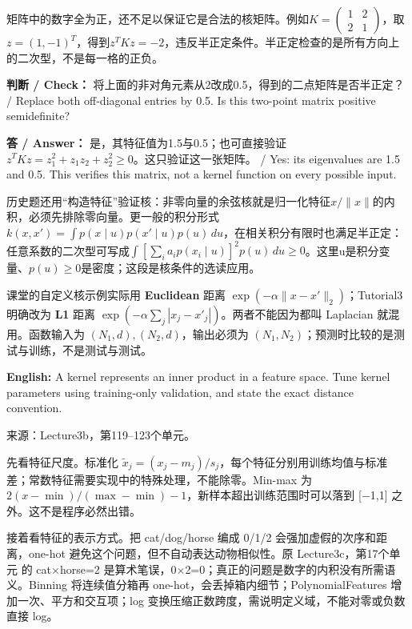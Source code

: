 矩阵中的数字全为正，还不足以保证它是合法的核矩阵。例如\(K=\left(\begin{smallmatrix}1&2\\2&1\end{smallmatrix}\right)\)，取\(z=(1,-1)^T\)，得到\(z^TKz=-2\)，违反半正定条件。半正定检查的是所有方向上的二次型，不是每一格的正负。


\textbf{判断 / Check：} 将上面的非对角元素从2改成0.5，得到的二点矩阵是否半正定？ / Replace both off-diagonal entries by 0.5. Is this two-point matrix positive semidefinite?


\textbf{答 / Answer：} 是，其特征值为1.5与0.5；也可直接验证\(z^TKz=z_1^2+z_1z_2+z_2^2\ge0\)。这只验证这一张矩阵。 / Yes: its eigenvalues are 1.5 and 0.5. This verifies this matrix, not a kernel function on every possible input.


历史题还用“构造特征”验证核：非零向量的余弦核就是归一化特征\(x/\|x\|\)的内积，必须先排除零向量。更一般的积分形式\(k(x,x')=\int p(x\mid u)p(x'\mid u)p(u)\,du\)，在相关积分有限时也满足半正定：任意系数的二次型可写成\(\int[\sum_i a_i p(x_i\mid u)]^2p(u)\,du\ge0\)。这里u是积分变量、\(p(u)\ge0\)是密度；这段是核条件的选读应用。


课堂的自定义核示例实际用 \textbf{Euclidean} 距离 \(\exp(-\alpha\|x-x'\|_2)\)；Tutorial3 明确改为 \textbf{L1} 距离 \(\exp(-\alpha\sum_j|x_j-x'_j|)\)。两者不能因为都叫 Laplacian 就混用。函数输入为 \((N_1,d),(N_2,d)\)，输出必须为 \((N_1,N_2)\)；预测时比较的是测试与训练，不是测试与测试。


\textbf{English:} A kernel represents an inner product in a feature space. Tune kernel parameters using training-only validation, and state the exact distance convention.


来源：Lecture3b，第119–123个单元。








先看特征尺度。标准化 \(\tilde x_j=(x_j-m_j)/s_j\)，每个特征分别用训练均值与标准差；常数特征需要实现中的特殊处理，不能除零。Min-max 为 \(2(x-\min)/(\max-\min)-1\)，新样本超出训练范围时可以落到 [\ensuremath{-}1,1] 之外。这不是程序必然出错。


接着看特征的表示方式。把 cat/dog/horse 编成 0/1/2 会强加虚假的次序和距离，one-hot 避免这个问题，但不自动表达动物相似性。原 Lecture3c，第17个单元 的 cat\ensuremath{\times}horse=2 是算术笔误，0\ensuremath{\times}2=0；真正的问题是数字的内积没有所需语义。Binning 将连续值分箱再 one-hot，会丢掉箱内细节；PolynomialFeatures 增加一次、平方和交互项；log 变换压缩正数跨度，需说明定义域，不能对零或负数直接 log。


